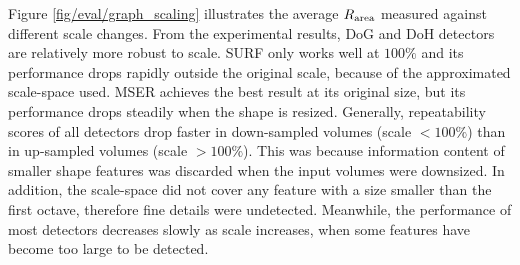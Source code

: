 Figure \ref{fig/eval/graph_scaling} illustrates the average $R_\textrm{area}$ measured against different scale changes. 
From the experimental results, DoG and DoH detectors are relatively more robust to scale. SURF only works well at $100\%$ and its performance drops rapidly outside the original scale, because of the approximated scale-space used. MSER achieves the best result at its original size, but its performance drops steadily when the shape is resized.
Generally, repeatability scores of all detectors drop faster in down-sampled volumes (scale $< 100\%$) than in up-sampled volumes (scale $> 100\%$). 
This was because information content of smaller shape features was discarded when the input volumes were downsized.   
In addition, the scale-space did not cover any feature with a size smaller than the first octave, therefore fine details were undetected.  
Meanwhile, the performance of most detectors decreases slowly as scale increases, when some features have become too large to be detected. 
